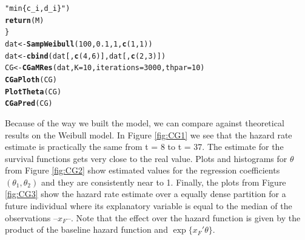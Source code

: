\documentclass[letterpaper]{article}\usepackage[]{graphicx}\usepackage[]{color}
\makeatletter
\newcommand{\hlnum}[1]{\textcolor[rgb]{0.686,0.059,0.569}{#1}}%
\newcommand{\hlstr}[1]{\textcolor[rgb]{0.192,0.494,0.8}{#1}}%
\newcommand{\hlstd}[1]{\textcolor[rgb]{0.345,0.345,0.345}{#1}}%
\newcommand{\hlkwb}[1]{\textcolor[rgb]{0.69,0.353,0.396}{#1}}%
\newcommand{\hlkwc}[1]{\textcolor[rgb]{0.333,0.667,0.333}{#1}}%
\newcommand{\hlkwd}[1]{\textcolor[rgb]{0.737,0.353,0.396}{\textbf{#1}}}%
\newenvironment{kframe}{%
 \def\at@end@of@kframe{}%
 \ifinner\ifhmode%
  \def\at@end@of@kframe{\end{minipage}}%
  \begin{minipage}{\columnwidth}%
 \fi\fi%
 \def\FrameCommand##1{\hskip\@totalleftmargin \hskip-\fboxsep
 \colorbox{shadecolor}{##1}\hskip-\fboxsep
     \hskip-\linewidth \hskip-\@totalleftmargin \hskip\columnwidth}%
 \MakeFramed {\advance\hsize-\width
   \@totalleftmargin\z@ \linewidth\hsize
   \@setminipage}}%
 {\par\unskip\endMakeFramed%
 \at@end@of@kframe}
\newenvironment{knitrout}{}{} %
\makeatother
\begin{document}
\begin{knitrout}
\begin{kframe}
\begin{alltt}
                   \hlstr{"min\{c_i, d_i\}"}\hlstd{)}
  \hlkwd{return}\hlstd{(M)}
\hlstd{\}}
\hlstd{dat} \hlkwb{<-} \hlkwd{SampWeibull}\hlstd{(}\hlnum{100}\hlstd{,} \hlnum{0.1}\hlstd{,} \hlnum{1}\hlstd{,} \hlkwd{c}\hlstd{(}\hlnum{1}\hlstd{,} \hlnum{1}\hlstd{))}
\hlstd{dat} \hlkwb{<-} \hlkwd{cbind}\hlstd{(dat[,} \hlkwd{c}\hlstd{(}\hlnum{4}\hlstd{,} \hlnum{6}\hlstd{)], dat[,} \hlkwd{c}\hlstd{(}\hlnum{2}\hlstd{,} \hlnum{3}\hlstd{)])}
\hlstd{CG} \hlkwb{<-} \hlkwd{CGaMRes}\hlstd{(dat,} \hlkwc{K} \hlstd{=} \hlnum{10}\hlstd{,} \hlkwc{iterations} \hlstd{=} \hlnum{3000}\hlstd{,} \hlkwc{thpar} \hlstd{=} \hlnum{10}\hlstd{)}
\hlkwd{CGaPloth}\hlstd{(CG)}
\hlkwd{PlotTheta}\hlstd{(CG)}
\hlkwd{CGaPred}\hlstd{(CG)}
\end{alltt}
\end{kframe}
\end{knitrout}

Because of the way we built the model, we can compare against theoretical results on the Weibull model. In Figure \ref{fig:CG1} we see that the hazard rate estimate is practically the same from t = 8 to t = 37. The estimate for the survival functions gets very close to the real value. Plots and histograms for $\theta$ from Figure \ref{fig:CG2} show estimated values for the regression coefficients $(\theta_1,\theta_2)$ and they are consistently near to 1. Finally, the plots from Figure \ref{fig:CG3} show the hazard rate estimate over a equally dense partition for a future individual where its explanatory variable is equal to the median of the observations --$x_F$--. Note that the effect over the hazard function is given by the product of the baseline hazard function and $\exp\{x_F'\theta\}$.
 
\end{document}
